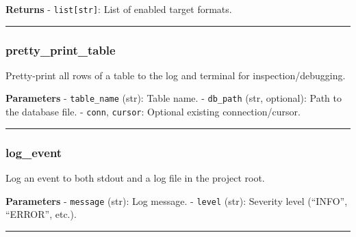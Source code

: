 \textbf{Returns} - \texttt{list{[}str{]}}: List of enabled target
formats.

\begin{center}\rule{0.5\linewidth}{0.5pt}\end{center}

\subsubsection{pretty\_print\_table}\label{pretty_print_table}

\begin{Shaded}
\begin{Highlighting}[]
\OperatorTok{=}\OperatorTok{=}\OperatorTok{=}\NormalTok{)}
\end{Highlighting}
\end{Shaded}

Pretty-print all rows of a table to the log and terminal for
inspection/debugging.

\textbf{Parameters} - \texttt{table\_name} (str): Table name. -
\texttt{db\_path} (str, optional): Path to the database file. -
\texttt{conn}, \texttt{cursor}: Optional existing connection/cursor.

\begin{center}\rule{0.5\linewidth}{0.5pt}\end{center}

\subsubsection{log\_event}\label{log_event}

\begin{Shaded}
\begin{Highlighting}[]
\OperatorTok{=}\NormalTok{)}
\end{Highlighting}
\end{Shaded}

Log an event to both stdout and a log file in the project root.

\textbf{Parameters} - \texttt{message} (str): Log message. -
\texttt{level} (str): Severity level (``INFO'', ``ERROR'', etc.).

\begin{center}\rule{0.5\linewidth}{0.5pt}\end{center}

